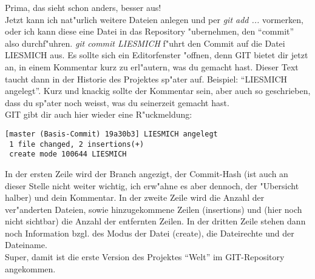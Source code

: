 \documentclass[german,a4paper]{report}
\begin{document}
Prima, das sieht schon anders, besser aus!\\
Jetzt kann ich nat"urlich weitere Dateien anlegen und per \textit{git add ...} vormerken,
oder ich kann diese eine Datei in das Repository "ubernehmen, den ``commit'' also
durchf"uhren. \textit{git commit LIESMICH} f"uhrt den Commit auf die Datei LIESMICH aus.
Es sollte sich ein Editorfenster "offnen, denn GIT bietet dir jetzt an, in einem
Kommentar kurz zu erl"autern,
was du gemacht hast. Dieser Text taucht dann in der Historie des Projektes sp"ater auf.
Beispiel: ``LIESMICH angelegt''. Kurz und knackig sollte der Kommentar sein, aber auch
so geschrieben, dass du sp"ater noch weisst, was du seinerzeit gemacht hast.\\
GIT gibt dir auch hier wieder eine R"uckmeldung:
\begin{verbatim}
[master (Basis-Commit) 19a30b3] LIESMICH angelegt
 1 file changed, 2 insertions(+)
 create mode 100644 LIESMICH
\end{verbatim}
In der ersten Zeile wird der Branch angezigt, der Commit-Hash (ist auch an dieser Stelle
nicht weiter wichtig, ich erw"ahne es aber dennoch, der "Ubersicht halber) und dein
Kommentar. In der zweite Zeile wird die Anzahl der ver"anderten Dateien, sowie hinzugekommene
Zeilen (insertions) und (hier noch nicht sichtbar) die Anzahl der entfernten Zeilen.
In der dritten Zeile stehen dann noch Information bzgl. des Modus der Datei (create), die
Dateirechte und der Dateiname.\\
Super, damit ist die erste Version des Projektes ``Welt'' im GIT-Repository angekommen.
\end{document}
